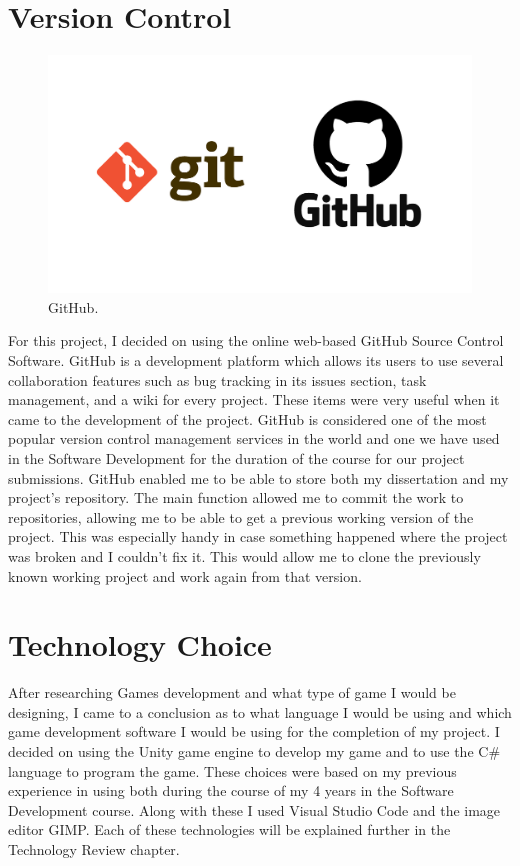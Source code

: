 \section{Version Control}
\begin{figure}[h]
  \includegraphics[width=\linewidth]{Images/GitHub.png}
  \caption{GitHub.}
  \label{fig:GitHub}
\end{figure}
For this project, I decided on using the online web-based GitHub Source Control Software. GitHub is a development platform which allows its users to use several collaboration features such as bug tracking in its issues section, task management, and a wiki for every project. These items were very useful when it came to the development of the project. GitHub is considered one of the most popular version control management services in the world and one we have used in the Software Development for the duration of the course for our project submissions. 
GitHub enabled me to be able to store both my dissertation and my project's repository. The main function allowed me to commit the work to repositories, allowing me to be able to get a previous  working version of the project. This was especially handy in case something happened where the project was broken and I couldn't fix it. This would allow me to clone the previously known working project and work again from that version. \cite{AboutGitHub}

\section{Technology Choice}
After researching Games development and what type of game I would be designing, I came to a conclusion as to what language I would be using and which game development software I would be using for the completion of my project. I decided on using the Unity game engine to develop my game and to use the C\# language to program the game. These choices were based on my previous experience in using both during the course of my 4 years in the Software Development course. Along with these I used Visual Studio Code and the image editor GIMP. Each of these technologies will be explained further in the Technology Review chapter.
